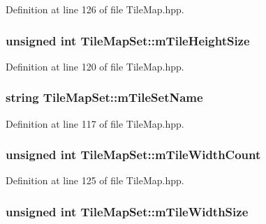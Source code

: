 Definition at line 126 of file Tile\-Map.\-hpp.

\hypertarget{class_tile_map_set_aa4620605087a8738afdfa4ef3e5fad99}{
\subsubsection[{m\-Tile\-Height\-Size}]{\setlength{\rightskip}{0pt plus 5cm}unsigned int Tile\-Map\-Set\-::m\-Tile\-Height\-Size\hspace{0.3cm}{\ttfamily [protected]}}}\label{class_tile_map_set_aa4620605087a8738afdfa4ef3e5fad99}


Definition at line 120 of file Tile\-Map.\-hpp.

\hypertarget{class_tile_map_set_a355b36e8f407752bd128b2a7d8babbba}{
\subsubsection[{m\-Tile\-Set\-Name}]{\setlength{\rightskip}{0pt plus 5cm}string Tile\-Map\-Set\-::m\-Tile\-Set\-Name\hspace{0.3cm}{\ttfamily [protected]}}}\label{class_tile_map_set_a355b36e8f407752bd128b2a7d8babbba}


Definition at line 117 of file Tile\-Map.\-hpp.

\hypertarget{class_tile_map_set_a53e0c59bfbd6285e0b0ca8f79a4af02c}{
\subsubsection[{m\-Tile\-Width\-Count}]{\setlength{\rightskip}{0pt plus 5cm}unsigned int Tile\-Map\-Set\-::m\-Tile\-Width\-Count\hspace{0.3cm}{\ttfamily [protected]}}}\label{class_tile_map_set_a53e0c59bfbd6285e0b0ca8f79a4af02c}


Definition at line 125 of file Tile\-Map.\-hpp.

\hypertarget{class_tile_map_set_ad1dee478b0dd00ff72a6635fd068b8cb}{
\subsubsection[{m\-Tile\-Width\-Size}]{\setlength{\rightskip}{0pt plus 5cm}unsigned int Tile\-Map\-Set\-::m\-Tile\-Width\-Size\hspace{0.3cm}{\ttfamily [protected]}}}\label{class_tile_map_set_ad1dee478b0dd00ff72a6635fd068b8cb}


